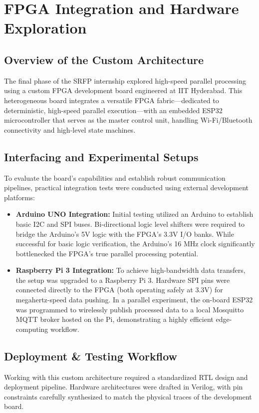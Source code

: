 \documentclass[12pt, a4paper]{report}
\begin{document}
\chapter{FPGA Integration and Hardware Exploration}

\section{Overview of the Custom Architecture}
The final phase of the SRFP internship explored high-speed parallel processing using a custom FPGA development board engineered at IIT Hyderabad. This heterogeneous board integrates a versatile FPGA fabric—dedicated to deterministic, high-speed parallel execution—with an embedded ESP32 microcontroller that serves as the master control unit, handling Wi-Fi/Bluetooth connectivity and high-level state machines.

\section{Interfacing and Experimental Setups}
To evaluate the board's capabilities and establish robust communication pipelines, practical integration tests were conducted using external development platforms:

\begin{itemize}
    \item \textbf{Arduino UNO Integration:} Initial testing utilized an Arduino to establish basic I2C and SPI buses. Bi-directional logic level shifters were required to bridge the Arduino's 5V logic with the FPGA's 3.3V I/O banks. While successful for basic logic verification, the Arduino's 16 MHz clock significantly bottlenecked the FPGA's true parallel processing potential.
    
    \item \textbf{Raspberry Pi 3 Integration:} To achieve high-bandwidth data transfers, the setup was upgraded to a Raspberry Pi 3. Hardware SPI pins were connected directly to the FPGA (both operating safely at 3.3V) for megahertz-speed data pushing. In a parallel experiment, the on-board ESP32 was programmed to wirelessly publish processed data to a local Mosquitto MQTT broker hosted on the Pi, demonstrating a highly efficient edge-computing workflow.
\end{itemize}

\section{Deployment \& Testing Workflow}
Working with this custom architecture required a standardized RTL design and deployment pipeline. Hardware architectures were drafted in Verilog, with pin constraints carefully synthesized to match the physical traces of the development board. 
\end{document}
